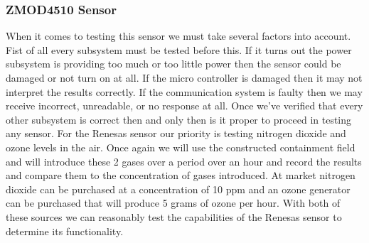 \subsubsection{ZMOD4510 Sensor}
When it comes to testing this sensor we must take several factors into account. Fist of all every subsystem must be tested before this. If it turns out the power subsystem is providing too much or too little power then the sensor could be damaged or not turn on at all. If the micro controller is damaged then it may not interpret the results correctly. If the communication system is faulty then we may receive incorrect, unreadable, or no response at all. Once we've verified that every other subsystem is correct then and only then is it proper to proceed in testing any sensor.
For the Renesas sensor our priority is testing nitrogen dioxide and ozone levels in the air. Once again we will use the constructed containment field and will introduce these 2 gases over a period over an hour and record the results and compare them to the concentration of gases introduced. At market nitrogen dioxide can be purchased at a concentration of 10 ppm and an ozone generator can be purchased that will produce 5 grams of ozone per hour. With both of these sources we can reasonably test the capabilities of the Renesas sensor to determine its functionality.

